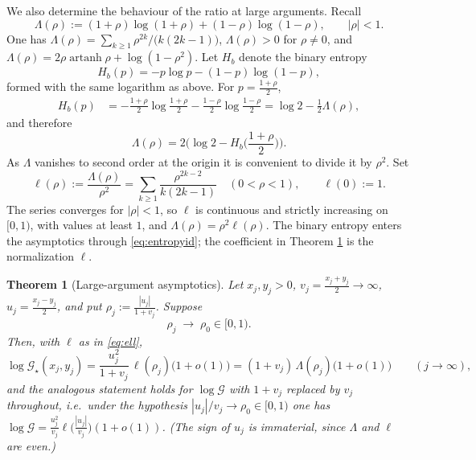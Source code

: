 \documentclass[11pt,a4paper]{amsart}
\newtheorem{theorem}{Theorem}[section]
\theoremstyle{definition}
\newcommand{\Gg}{\mathcal{G}}
\newcommand{\Gs}{\mathcal{G}_{\star}}
\DeclareMathOperator{\artanh}{artanh}
\begin{document}
We also determine the behaviour of the ratio at large arguments. Recall
\begin{equation}\label{eq:Lambda}
  \Lambda(\rho):=(1+\rho)\log(1+\rho)+(1-\rho)\log(1-\rho),\qquad |\rho|<1 .
\end{equation}
One has $\Lambda(\rho)=\sum_{k\ge1}\rho^{2k}/\big(k(2k-1)\big)$, $\Lambda(\rho)>0$ for
$\rho\ne0$, and $\Lambda(\rho)=2\rho\artanh\rho+\log(1-\rho^{2})$. Let $H_b$ denote the
binary entropy
\begin{equation}\label{eq:entropy}
  H_b(p)=-p\log p-(1-p)\log(1-p),
\end{equation}
formed with the same logarithm as above. For $p=\frac{1+\rho}{2}$,
\begin{align*}
  H_b(p)
  &=-\frac{1+\rho}{2}\log\frac{1+\rho}{2}-\frac{1-\rho}{2}\log\frac{1-\rho}{2}
   =\log 2-\frac12\Lambda(\rho),
\end{align*}
and therefore
\begin{equation}\label{eq:entropyid}
  \Lambda(\rho)=2\Big(\log 2-H_b\Big(\frac{1+\rho}{2}\Big)\Big).
\end{equation}
As $\Lambda$ vanishes to second order at the origin it is convenient to divide it by
$\rho^{2}$. Set
\begin{equation}\label{eq:ell}
  \ell(\rho):=\frac{\Lambda(\rho)}{\rho^{2}}
   =\sum_{k\ge1}\frac{\rho^{2k-2}}{k(2k-1)}\quad(0<\rho<1),
  \qquad \ell(0):=1 .
\end{equation}
The series converges for $|\rho|<1$, so $\ell$ is continuous and strictly increasing on
$[0,1)$, with values at least $1$, and $\Lambda(\rho)=\rho^{2}\ell(\rho)$. The binary
entropy enters the asymptotics through \eqref{eq:entropyid}; the coefficient in
Theorem \ref{thm:asym} is the normalization $\ell$.

\begin{theorem}[Large-argument asymptotics]\label{thm:asym}
Let $x_{j},y_{j}>0$, $v_{j}=\tfrac{x_j+y_j}{2}\to\infty$, $u_{j}=\tfrac{x_j-y_j}{2}$, and
put $\rho_{j}:=\frac{|u_{j}|}{1+v_{j}}$. Suppose
\[
  \rho_{j}\;\longrightarrow\;\rho_{0}\in[0,1).
\]
Then, with $\ell$ as in \eqref{eq:ell},
\[
  \log\Gs(x_{j},y_{j})
   =\frac{u_{j}^{2}}{1+v_{j}}\,\ell(\rho_{j})\big(1+o(1)\big)
   =(1+v_{j})\,\Lambda(\rho_{j})\big(1+o(1)\big)
  \qquad (j\to\infty),
\]
and the analogous statement holds for $\log\Gg$ with $1+v_j$ replaced by $v_j$
throughout, i.e.\ under the hypothesis $|u_j|/v_j\to\rho_0\in[0,1)$ one has
$\log\Gg=\frac{u_j^{2}}{v_j}\ell\big(\frac{|u_j|}{v_j}\big)(1+o(1))$. (The sign of $u_j$ is
immaterial, since $\Lambda$ and $\ell$ are even.)
\end{theorem}
\end{document}
